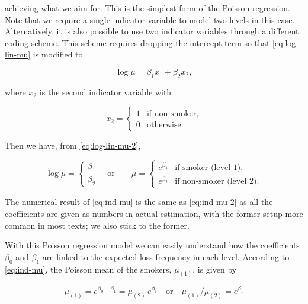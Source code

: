 \documentclass[]{book}
\theoremstyle{definition}
\theoremstyle{definition}
\theoremstyle{definition}
\theoremstyle{remark}
\begin{document}
achieving what we aim for. This is the simplest form of the Poisson
regression. Note that we require a single indicator variable to model
two levels in this case. Alternatively, it is also possible to use two
indicator variables through a different coding scheme. This scheme
requires dropping the intercept term so that \eqref{eq:log-lin-mu} is
modified to

\begin{equation}
\log \mu=\beta_1 x_1+\beta_2 x_2,
\label{eq:log-lin-mu-2}
\end{equation}

where \(x_2\) is the second indicator variable with

\begin{equation}
x_2=
\begin{cases}
     1 & \text{if non-smoker}, \\
     0 & \text{otherwise}.
\end{cases}
\label{eq:dummy-x-2}
\end{equation}

Then we have, from \eqref{eq:log-lin-mu-2},

\begin{equation}
\log \mu=
\begin{cases}
     \beta_1 \\
     \beta_2 
\end{cases}
\quad \text{or}\qquad \mu= \begin{cases}
     e^{\beta_1} & \text{if smoker (level 1)}, \\
     e^{\beta_2} & \text{if non-smoker (level 2)}.
\end{cases}
\label{eq:ind-mu-2}
\end{equation}

The numerical result of \eqref{eq:ind-mu} is the same as \eqref{eq:ind-mu-2}
as all the coefficients are given as numbers in actual estimation, with
the former setup more common in most texts; we also stick to the former.

With this Poisson regression model we can easily understand how the
coefficients \(\beta_0\) and \(\beta_1\) are linked to the expected loss
frequency in each level. According to \eqref{eq:ind-mu}, the Poisson mean
of the smokers, \(\mu_{(1)}\), is given by

\begin{equation}
\mu_{(1)}=e^{\beta_0+\beta_1}=\mu_{(2)} \,e^{\beta_1} \quad \text{or}\quad  \mu_{(1)}/\mu_{(2)} =e^{\beta_1}
\label{eq:no-label}
\end{equation}
\end{document}
